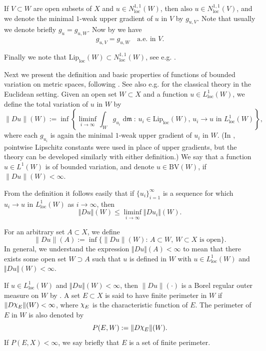 \documentclass[11pt]{article}
\numberwithin{equation}{section}
\theoremstyle{plain}
\theoremstyle{definition}
\numberwithin{equation}{section}
\newcommand{\loc}{\mathrm{loc}}
\newcommand{\BV}{\mathrm{BV}}
\newcommand{\liploc}{\mathrm{Lip}_{\mathrm{loc}}}
\newcommand{\ch}{\text{\raise 1.3pt \hbox{$\chi$}\kern-0.2pt}}
\DeclareMathOperator{\dfrm}{d\mathfrak{m}}
\begin{document}
If $V\subset W$ are open subsets of $X$ and $u\in N_{\loc}^{1,1}(W)$, then also $u\in N_{\loc}^{1,1}(V)$,
and we denote the minimal $1$-weak upper gradient of $u$ in $V$ by $g_{u,V}$.
Note that usually we denote briefly $g_u=g_{u,W}$.
Now by \cite[Lemma 2.23]{BB} we have
\begin{equation}\label{eq:minimal ug wrt open set}
g_{u,V}=g_{u,W}\quad \textrm{a.e. in }V.
\end{equation}

Finally we note that $\liploc(W)\subset N_{\loc}^{1,1}(W)$,
see e.g. \cite[Proposition 1.14]{BB}.

Next we present the definition and basic properties of functions
of bounded variation on metric spaces, following \cite{M}. See also e.g. \cite{AFP, Fed} for the classical 
theory in the Euclidean setting.
Given an open set $W\subset X$ and a function $u\in L^1_{\loc}(W)$,
we define the total variation of $u$ in $W$ by
\[
\|Du\|(W):=\inf\left\{\liminf_{i\to\infty}\int_W g_{u_i}\dfrm:\, u_i\in \liploc(W),\, u_i\to u\textrm{ in } L^1_{\loc}(W)\right\},
\]
where each $g_{u_i}$ is again the minimal $1$-weak upper gradient of $u_i$
in $W$.
(In \cite{M}, pointwise Lipschitz constants were used in place of upper gradients, but the theory
can be developed similarly with either definition.)
We say that a function $u\in L^1(W)$ is of bounded variation, 
and denote $u\in\BV(W)$, if $\|Du\|(W)<\infty$.

From the definition it follows easily that if
$\{u_i\}_{i=1}^{\infty}$ is a sequence for which
$u_i\to u$ in $L^1_{\loc}(W)$ as $i\to\infty$, then
\begin{equation}\label{eq:lower semicontinuity}
\Vert Du\Vert(W)\le \liminf_{i\to\infty}\Vert Du_i\Vert(W).
\end{equation}

For an arbitrary set $A\subset X$, we define
\begin{equation}\label{eq:tot var arbitrary set}
\|Du\|(A):=\inf\{\|Du\|(W):\, A\subset W,\,W\subset X
\text{ is open}\}.
\end{equation}
In general, we understand the expression $\Vert Du\Vert(A)<\infty$ to mean that
there exists some open set $W\supset A$ such that $u$ is defined in $W$ with $u\in L^1_{\loc}(W)$ and $\Vert Du\Vert(W)<\infty$.

If $u\in L^1_{\loc}(W)$ and $\Vert Du\Vert(W)<\infty$,
then $\|Du\|(\cdot)$ is
a Borel regular outer measure on $W$ by \cite[Theorem 3.4]{M}.
A set $E\subset X$ is said to have finite perimeter
in $W$ if $\|D\ch_E\|(W)<\infty$, where $\ch_E$ is the characteristic function of $E$.
The perimeter of $E$ in $W$ is also denoted by
\[
P(E,W):=\|D\ch_E\|(W).
\]
If $P(E,X)<\infty$, we say briefly that $E$ is a set of finite perimeter.
\end{document}
